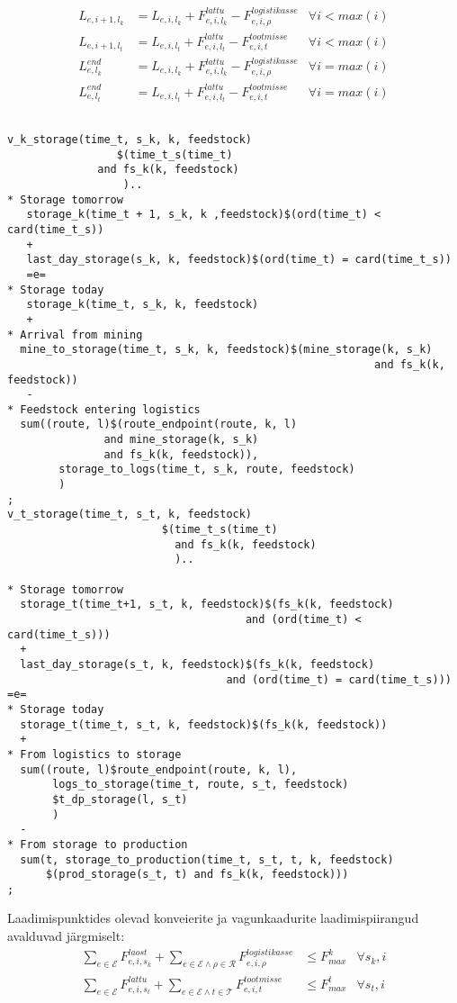 \documentclass[10pt,a4paper]{article}
\begin{document}
\begin{align}
L_{e,i+1,l_k} &= L_{e,i,l_k} + F^{lattu}_{e,i,l_k} - F^{logistikasse}_{e,i,\rho} & \forall i < max(i) \\
L_{e,i+1,l_t} &= L_{e,i,l_t} + F^{lattu}_{e,i,l_t} - F^{tootmisse}_{e,i,t} & \forall i < max(i) \\
L^{end}_{e,l_k} &= L_{e,i,l_k} + F^{lattu}_{e,i,l_k} - F^{logistikasse}_{e,i,\rho} & \forall i = max(i)\\
L^{end}_{e,l_t} &= L_{e,i,l_t} + F^{lattu}_{e,i,l_t} - F^{tootmisse}_{e,i,t}  & \forall i = max(i)
\end{align}
\begin{verbatim}

v_k_storage(time_t, s_k, k, feedstock)
                 $(time_t_s(time_t)
              and fs_k(k, feedstock)
                  )..
* Storage tomorrow
   storage_k(time_t + 1, s_k, k ,feedstock)$(ord(time_t) < card(time_t_s))
   +
   last_day_storage(s_k, k, feedstock)$(ord(time_t) = card(time_t_s))
   =e=
* Storage today
   storage_k(time_t, s_k, k, feedstock)
   +
* Arrival from mining
  mine_to_storage(time_t, s_k, k, feedstock)$(mine_storage(k, s_k)
                                                         and fs_k(k, feedstock))
   -
* Feedstock entering logistics
  sum((route, l)$(route_endpoint(route, k, l)
               and mine_storage(k, s_k)
               and fs_k(k, feedstock)),
        storage_to_logs(time_t, s_k, route, feedstock)
        )
;
v_t_storage(time_t, s_t, k, feedstock)
                        $(time_t_s(time_t)
                          and fs_k(k, feedstock)
                          )..

* Storage tomorrow
  storage_t(time_t+1, s_t, k, feedstock)$(fs_k(k, feedstock) 
                                     and (ord(time_t) < card(time_t_s)))
  +
  last_day_storage(s_t, k, feedstock)$(fs_k(k, feedstock) 
                                  and (ord(time_t) = card(time_t_s)))
=e=
* Storage today
  storage_t(time_t, s_t, k, feedstock)$(fs_k(k, feedstock))
  +
* From logistics to storage
  sum((route, l)$route_endpoint(route, k, l),
       logs_to_storage(time_t, route, s_t, feedstock)
       $t_dp_storage(l, s_t)
       )
  -
* From storage to production
  sum(t, storage_to_production(time_t, s_t, t, k, feedstock)
      $(prod_storage(s_t, t) and fs_k(k, feedstock)))
;
\end{verbatim}
Laadimispunktides olevad konveierite ja vagunkaadurite laadimispiirangud avalduvad järgmiselt:
\begin{align}
\sum_{e\in \mathcal{E}}F^{laost}_{e,i,s_k} + \sum_{e\in \mathcal{E} \land \rho\in\mathcal{R}}F^{logistikasse}_{e,i,\rho} &\leq \mathit{F}^k_{max} &\forall s_k,i\\
\sum_{e\in \mathcal{E}}F^{lattu}_{e,i,s_t} + \sum_{e\in \mathcal{E}\land t\in\mathcal{T}}F^{tootmisse}_{e,i,t} &\leq \mathit{F}^t_{max} &\forall s_t,i
\end{align}
\end{document}
